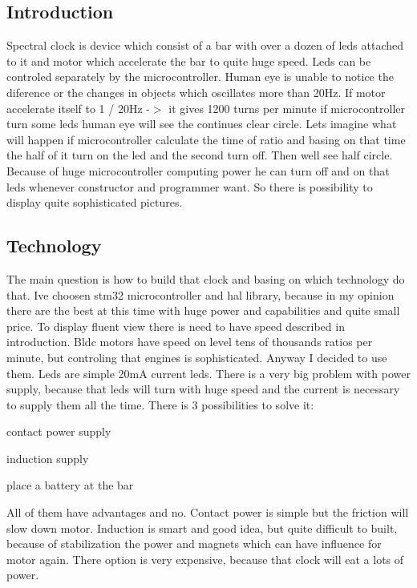 \subsection*{Introduction}

Spectral clock is device which consist of a bar with over a dozen of leds attached to it and motor which accelerate the bar to quite huge speed. Leds can be controled separately by the microcontroller. Human eye is unable to notice the diference or the changes in objects which oscillates more than 20\+Hz. If motor accelerate itself to 1 / 20\+Hz -\/$>$ it gives 1200 turns per minute if microcontroller turn some leds human eye will see the continues clear circle. Lets imagine what will happen if microcontroller calculate the time of ratio and basing on that time the half of it turn on the led and the second turn off. Then we\textquotesingle{}ll see half circle. Because of huge microcontroller computing power he can turn off and on that leds whenever constructor and programmer want. So there is possibility to display quite sophisticated pictures.

\subsection*{Technology}

The main question is how to build that clock and basing on which technology do that. I\textquotesingle{}ve choosen stm32 microcontroller and hal library, because in my opinion there are the best at this time with huge power and capabilities and quite small price. To display fluent view there is need to have speed described in introduction. Bldc motors have speed on level tens of thousands ratios per minute, but controling that engines is sophisticated. Anyway I decided to use them. Leds are simple 20mA current leds. There is a very big problem with power supply, because that leds will turn with huge speed and the current is necessary to supply them all the time. There is 3 possibilities to solve it\+:
\begin{DoxyEnumerate}
\item contact power supply
\item induction supply
\item place a battery at the bar
\end{DoxyEnumerate}

All of them have advantages and no. Contact power is simple but the friction will slow down motor. Induction is smart and good idea, but quite difficult to built, because of stabilization the power and magnets which can have influence for motor again. There option is very expensive, because that clock will eat a lots of power.

